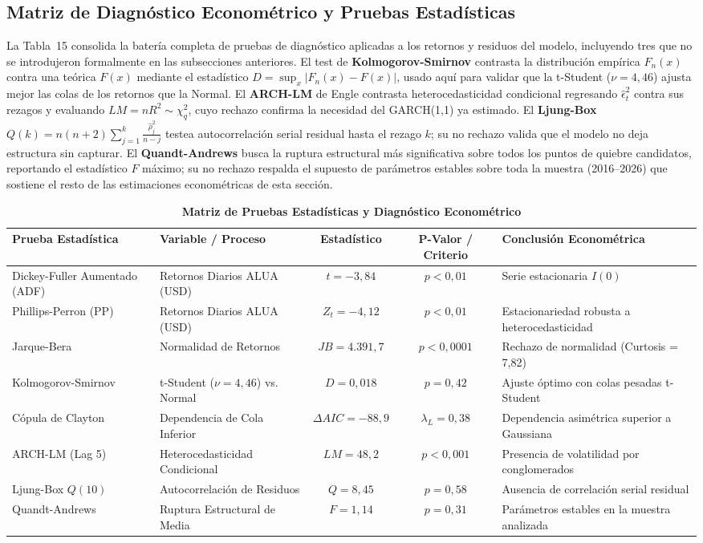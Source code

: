 \documentclass[10pt,a4paper]{article}
\begin{document}
\subsection{Matriz de Diagnóstico Econométrico y Pruebas Estadísticas}
La Tabla~15 consolida la batería completa de pruebas de diagnóstico aplicadas a los retornos y residuos del modelo, incluyendo tres que no se introdujeron formalmente en las subsecciones anteriores. El test de \textbf{Kolmogorov-Smirnov} contrasta la distribución empírica $F_n(x)$ contra una teórica $F(x)$ mediante el estadístico $D = \sup_x |F_n(x) - F(x)|$, usado aquí para validar que la t-Student ($\nu=4,46$) ajusta mejor las colas de los retornos que la Normal. El \textbf{ARCH-LM} de Engle contrasta heterocedasticidad condicional regresando $\hat\epsilon_t^2$ contra sus rezagos y evaluando $LM = nR^2 \sim \chi^2_q$, cuyo rechazo confirma la necesidad del GARCH(1,1) ya estimado. El \textbf{Ljung-Box} $Q(k) = n(n+2)\sum_{j=1}^{k}\frac{\hat\rho_j^2}{n-j}$ testea autocorrelación serial residual hasta el rezago $k$; su no rechazo valida que el modelo no deja estructura sin capturar. El \textbf{Quandt-Andrews} busca la ruptura estructural más significativa sobre todos los puntos de quiebre candidatos, reportando el estadístico $F$ máximo; su no rechazo respalda el supuesto de parámetros estables sobre toda la muestra (2016--2026) que sostiene el resto de las estimaciones econométricas de esta sección.
\begin{table}[H]
\centering
\caption{\textbf{Matriz de Pruebas Estadísticas y Diagnóstico Econométrico}}
\scriptsize
\begin{tabularx}{\textwidth}{llccl}
\toprule
\textbf{Prueba Estadística} & \textbf{Variable / Proceso} & \textbf{Estadístico} & \textbf{P-Valor / Criterio} & \textbf{Conclusión Econométrica} \\
\midrule
Dickey-Fuller Aumentado (ADF) & Retornos Diarios ALUA (USD) & $t = -3,84$ & $p < 0,01$ & Serie estacionaria $I(0)$ \\
Phillips-Perron (PP) & Retornos Diarios ALUA (USD) & $Z_t = -4,12$ & $p < 0,01$ & Estacionariedad robusta a heterocedasticidad \\
Jarque-Bera & Normalidad de Retornos & $JB = 4.391,7$ & $p < 0,0001$ & Rechazo de normalidad (Curtosis = 7,82) \\
Kolmogorov-Smirnov & t-Student ($\nu=4,46$) vs. Normal & $D = 0,018$ & $p = 0,42$ & Ajuste óptimo con colas pesadas t-Student \\
Cópula de Clayton & Dependencia de Cola Inferior & $\Delta AIC = -88,9$ & $\lambda_L = 0,38$ & Dependencia asimétrica superior a Gaussiana \\
ARCH-LM (Lag 5) & Heterocedasticidad Condicional & $LM = 48,2$ & $p < 0,001$ & Presencia de volatilidad por conglomerados \\
Ljung-Box $Q(10)$ & Autocorrelación de Residuos & $Q = 8,45$ & $p = 0,58$ & Ausencia de correlación serial residual \\
Quandt-Andrews & Ruptura Estructural de Media & $F = 1,14$ & $p = 0,31$ & Parámetros estables en la muestra analizada \\
\bottomrule
\end{tabularx}
\end{table}
\end{document}

